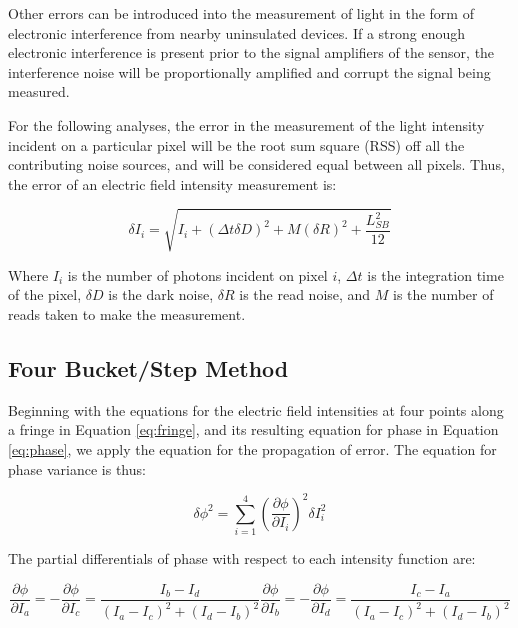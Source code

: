 \documentclass[10pt,letterpaper]{article}
\begin{document}
Other errors can be introduced into the measurement of light in the form of electronic interference from nearby uninsulated devices. If a strong enough electronic interference is present prior to the signal amplifiers of the sensor, the interference noise will be proportionally amplified and corrupt the signal being measured.\par

For the following analyses, the error in the measurement of the light intensity incident on a particular pixel will be the root sum square (RSS) off all the contributing noise sources, and will be considered equal between all pixels. Thus, the error of an electric field intensity measurement is:

\begin{equation}
\label{eq:intense}
\delta I_i=\sqrt{I_i+(\Delta t\delta D)^2+M(\delta R)^2+\frac{L_{SB}^2}{12}}
\end{equation}

Where $I_i$ is the number of photons incident on pixel $i$, $\Delta t$ is the integration time of the pixel, $\delta D$ is the dark noise, $\delta R$ is the read noise, and $M$ is the number of reads taken to make the measurement.

\subsection{Four Bucket/Step Method}

	Beginning with the equations for the electric field intensities at four points along a fringe in Equation \ref{eq:fringe}, and its resulting equation for phase in Equation \ref{eq:phase}, we apply the equation for the propagation of error. The equation for phase variance is thus:

\begin{equation}
\label{eq:propo}
\delta\phi^2=\sum_{i=1}^4\left(\frac{\partial \phi}{\partial I_i}\right)^2\delta I_i^2
\end{equation}

The partial differentials of phase with respect to each intensity function are:

\begin{subequations}
\begin{equation}
\label{eq:diffA4}
\frac{\partial \phi}{\partial I_a}=-\frac{\partial \phi}{\partial I_c}=\frac{I_b-I_d}{(I_a-I_c)^2+(I_d-I_b)^2}
\end{equation}
\begin{equation}
\label{eq:diffB4}
\frac{\partial \phi}{\partial I_b}=-\frac{\partial \phi}{\partial I_d}=\frac{I_c-I_a}{(I_a-I_c)^2+(I_d-I_b)^2}
\end{equation}
\end{subequations}
\end{document}
